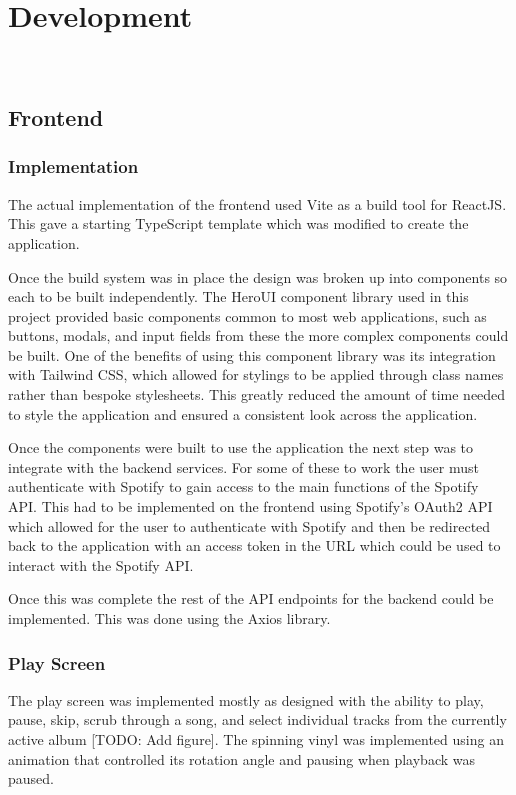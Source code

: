 \chapter{Development}~\label{cha:development}
\section{Frontend}
\subsection{Implementation}
The actual implementation of the frontend used Vite as a build tool for ReactJS. This gave a starting TypeScript template which was modified to create the application.

Once the build system was in place the design was broken up into components so each to be built independently. The HeroUI component library used in this project provided basic components common to most web applications, such as buttons, modals, and input fields from these the more complex components could be built. One of the benefits of using this component library was its integration with Tailwind CSS, which allowed for stylings to be applied through class names rather than bespoke stylesheets. This greatly reduced the amount of time needed to style the application and ensured a consistent look across the application.

Once the components were built to use the application the next step was to integrate with the backend services. For some of these to work the user must authenticate with Spotify to gain access to the main functions of the Spotify API. This had to be implemented on the frontend using Spotify's OAuth2 API which allowed for the user to authenticate with Spotify and then be redirected back to the application with an access token in the URL which could be used to interact with the Spotify API.

Once this was complete the rest of the API endpoints for the backend could be implemented. This was done using the Axios library.

\subsection{Play Screen}
The play screen was implemented mostly as designed with the ability to play, pause, skip, scrub through a song, and select individual tracks from the currently active album [TODO: Add figure]. The spinning vinyl was implemented using an animation that controlled its rotation angle and pausing when playback was paused.

